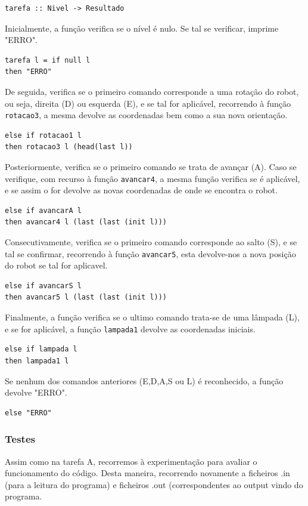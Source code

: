 \documentclass[a4paper]{article}
\begin{document}
\begin{lstlisting}[frame=single]
tarefa :: Nivel -> Resultado
\end{lstlisting}
Inicialmente, a função verifica se o nível é nulo. Se tal se verificar, imprime "ERRO".
\begin{lstlisting}[frame=single]
tarefa l = if null l 
then "ERRO"
\end{lstlisting}
De seguida, verifica se o primeiro comando corresponde a uma rotação do robot, ou seja, direita (D) ou esquerda (E), e se tal for aplicável, recorrendo à função \verb|rotacao3|, a mesma devolve as coordenadas bem como a sua nova orientação.
\begin{lstlisting}[frame=single]
else if rotacao1 l 
then rotacao3 l (head(last l))
\end{lstlisting}
Posteriormente, verifica se o primeiro comando se trata de avançar (A). Caso se verifique, com recurso à função \verb|avancar4|, a mesma função verifica se é aplicável, e se assim o for devolve as novas coordenadas de onde se encontra o robot.
\begin{lstlisting}[frame=single]
else if avancarA l
then avancar4 l (last (last (init l)))
\end{lstlisting}
Consecutivamente, verifica se o primeiro comando corresponde ao salto (S), e se tal se confirmar, recorrendo à função \verb|avancar5|, esta devolve-nos a nova posição do robot se tal for aplicavel.
\begin{lstlisting}[frame=single]
else if avancarS l 
then avancar5 l (last (last (init l)))
\end{lstlisting}
Finalmente, a função verifica se o ultimo comando trata-se de uma lâmpada (L), e se for aplicável, a função \verb|lampada1| devolve as coordenadas iniciais.
\begin{lstlisting}[frame=single]
else if lampada l
then lampada1 l 
\end{lstlisting}
Se nenhum dos comandos anteriores (E,D,A,S ou L) é reconhecido, a função devolve "ERRO".
\begin{lstlisting}[frame=single]
else "ERRO"

\end{lstlisting}

\subsubsection{Testes}

Assim como na tarefa A, recorremos à experimentação para avaliar o funcionamento do código. Desta maneira, recorrendo novamente a ficheiros .in (para a leitura do programa) e ficheiros .out (correspondentes ao output vindo do programa.
\end{document}
